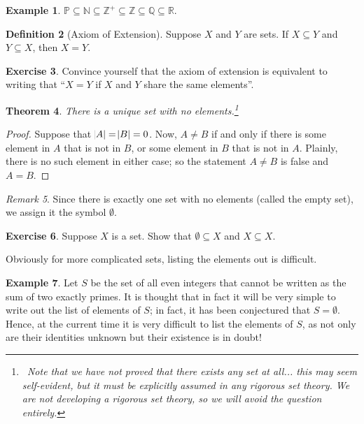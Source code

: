 \documentclass[a4paper]{amsart}
\newtheorem{thm}{Theorem}[section]
\theoremstyle{definition}
\newtheorem{defn}[thm]{Definition}
\newtheorem{ex}[thm]{Example}
\newtheorem{exercise}[thm]{Exercise}
\theoremstyle{remark}
\newtheorem{rem}[thm]{Remark}
\begin{document}
\begin{ex}
  $ \mathbb{P} \subseteq \mathbb{N} \subseteq \mathbb{Z}^+ \subseteq \mathbb{Z} \subseteq \mathbb{Q} \subseteq \mathbb{R} $.
\end{ex}

\begin{defn}[Axiom of Extension]
  Suppose $ X $ and $ Y $ are sets. If $ X \subseteq Y $ and $ Y \subseteq X $, then $ X = Y $.
\end{defn}

\begin{exercise}
  Convince yourself that the axiom of extension is equivalent to writing that ``$ X = Y $ if $ X $ and $ Y $ share the same elements''.
\end{exercise}

\begin{thm}
  There is a unique set with no elements.\footnote{~Note that we have not proved that there exists any set at all... this may seem
  self-evident, but it must be explicitly assumed in any rigorous set theory. We are not developing a rigorous set theory, so we will
  avoid the question entirely.}
\end{thm}
\begin{proof}
  Suppose that $ \abs{A} = \abs{B} = 0 $. Now, $ A \neq B $ if and only if there is some element in $ A $ that is not in $ B $,
  or some element in $ B $ that is not in $ A $. Plainly, there is no such element in either case; so the statement $ A \neq B $ is
  false and $ A = B $.
\end{proof}

\begin{rem}
  Since there is exactly one set with no elements (called the empty set), we assign it the symbol $ \emptyset $.
\end{rem}

\begin{exercise}
  Suppose $ X $ is a set. Show that $ \emptyset \subseteq X $ and $ X \subseteq X $.
\end{exercise}

Obviously for more complicated sets, listing the elements out is difficult.
\begin{ex}\label{ex:sumsquare}
  Let $ S $ be the set of all even integers that cannot be written as the sum of two exactly primes.
  It is thought that in fact it will be very simple to write out the list of elements of $ S $; in fact,
  it has been conjectured that $ S = \emptyset $. Hence, at the current time it is very difficult to
  list the elements of $ S $, as not only are their identities unknown but their existence is in doubt!
\end{ex}
\end{document}
